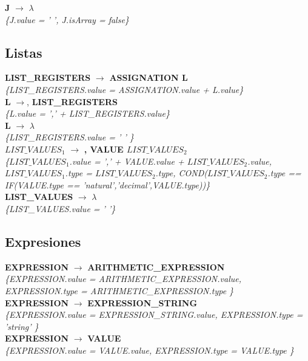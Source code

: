 \documentclass[10pt,a4paper]{article}
\begin{document}
\textbf{J} $\rightarrow$ $\lambda$   \\
\textit{\{J.value = ' ', J.isArray = false\}} \\

\subsection{Listas}
\textbf{LIST\_REGISTERS} $\rightarrow$ \textbf{ASSIGNATION L} \\
\textit{\{LIST\_REGISTERS.value = ASSIGNATION.value + L.value\}} \\

\textbf{L} $\rightarrow$, \textbf{LIST\_REGISTERS} \\
\textit{\{L.value = ',' + LIST\_REGISTERS.value\}} \\

\textbf{L} $\rightarrow$ $\lambda$\\
\textit{\{LIST\_REGISTERS.value =  ' ' \}}  \\ 

\textbf{$LIST\_VALUES_1$} $\rightarrow$ \textbf{, VALUE $LIST\_VALUES_2$} \\
\textit{\{$LIST\_VALUES_1$.value =  ',' + VALUE.value + $LIST\_VALUES_2$.value, $LIST\_VALUES_1$.type = $LIST\_VALUES_2$.type, COND($LIST\_VALUES_2$.type == IF(VALUE.type == 'natural','decimal',VALUE.type))\}} \\

\textbf{LIST\_VALUES} $\rightarrow$ $\lambda$ \\
\textit{\{LIST\_VALUES.value = ' '\}} \\

\subsection{Expresiones}
\textbf{EXPRESSION} $\rightarrow$ \textbf{ARITHMETIC\_EXPRESSION} \\   
\textit{\{EXPRESSION.value =  ARITHMETIC\_EXPRESSION.value, EXPRESSION.type = ARITHMETIC\_EXPRESSION.type \}}  \\

\textbf{EXPRESSION} $\rightarrow$ \textbf{EXPRESSION\_STRING} \\
\textit{\{EXPRESSION.value =  EXPRESSION\_STRING.value, EXPRESSION.type = 'string' \}}  \\ 

\textbf{EXPRESSION} $\rightarrow$ \textbf{VALUE} \\
\textit{\{EXPRESSION.value =  VALUE.value, EXPRESSION.type = VALUE.type \}} \\
\end{document}
